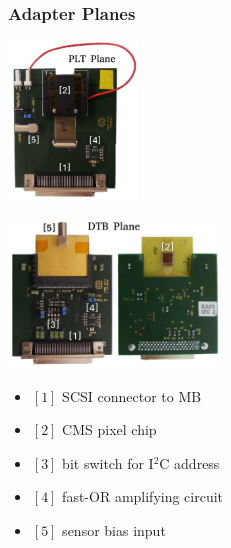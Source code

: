 \documentclass[9pt]{beamer}
\begin{document}
\begin{frame}
	\frametitle{Adapter Planes}
	\begin{center}
		\begin{minipage}{4cm}
			\centering
			\includegraphics[width=3.4cm]{Pics/AdapterAnalog}
		\end{minipage}
		\hspace*{2pt}
		\begin{minipage}{7cm}
			\centering
			\includegraphics[width=5.6cm]{Pics/AdapterDigital}
		\end{minipage}
	\end{center}
	\begin{center}
		\begin{minipage}{5.5cm}
			\begin{itemize}
				\item $[1]$ SCSI connector to MB
				\item $[2]$ CMS pixel chip
				\item $[3]$ bit switch for I$^{2}$C address
			\end{itemize}
		\end{minipage}
		\hspace*{2pt}
		\begin{minipage}{5.5cm}
			\begin{itemize}
				\item $[4]$ fast-OR amplifying circuit
				\item $[5]$ sensor bias input
			\end{itemize}
		\end{minipage}
	\end{center}
\end{frame}
\end{document}
